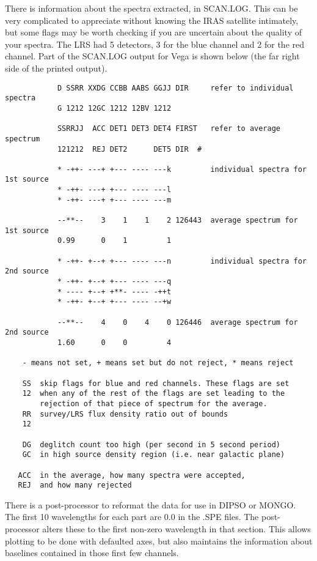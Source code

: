 There is information about the spectra extracted, in SCAN.LOG.
This can be very complicated to appreciate without knowing the IRAS satellite
intimately, but some flags may be worth checking if you are uncertain about
the quality of your spectra.
The LRS had 5 detectors, 3 for the blue channel and 2 for the red channel.
Part of the SCAN.LOG output for Vega is shown below (the far right side of
the printed output).
\begin{verbatim}
            D SSRR XXDG CCBB AABS GGJJ DIR     refer to individual spectra
            G 1212 12GC 1212 12BV 1212

            SSRRJJ  ACC DET1 DET3 DET4 FIRST   refer to average spectrum
            121212  REJ DET2      DET5 DIR  #

            * -++- ---+ +--- ---- ---k         individual spectra for 1st source
            * -++- ---+ +--- ---- ---l
            * -++- ---+ +--- ---- ---m

            --**--    3    1    1    2 126443  average spectrum for 1st source
            0.99      0    1         1

            * -++- +--+ +--- ---- ---n         individual spectra for 2nd source
            * -++- +--+ +--- ---- ---q
            * ---- +--+ +**- ---- -++t
            * -++- +--+ +--- ---- --+w

            --**--    4    0    4    0 126446  average spectrum for 2nd source
            1.60      0    0         4

    - means not set, + means set but do not reject, * means reject

    SS  skip flags for blue and red channels. These flags are set
    12  when any of the rest of the flags are set leading to the
        rejection of that piece of spectrum for the average.
    RR  survey/LRS flux density ratio out of bounds
    12

    DG  deglitch count too high (per second in 5 second period)
    GC  in high source density region (i.e. near galactic plane)

   ACC  in the average, how many spectra were accepted,
   REJ  and how many rejected
\end{verbatim}
There is a post-processor to reformat the data for use in DIPSO or MONGO.
The first 10 wavelengths for each part are 0.0 in the .SPE files.
The post-processor alters these to the first non-zero wavelength in that
section.
This allows plotting to be done with defaulted axes, but also maintains the
information about baselines contained in those first few channels.

